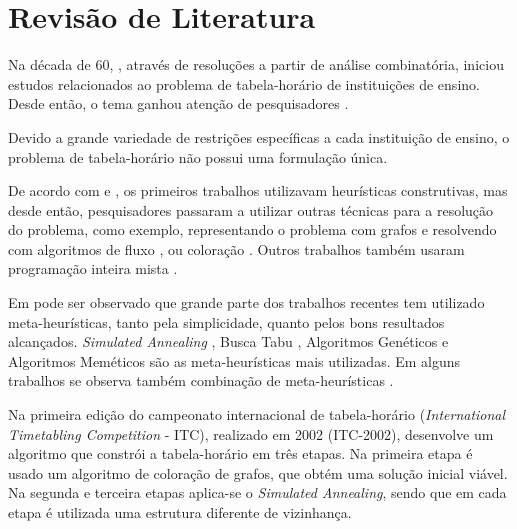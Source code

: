 \chapter{Revisão de Literatura}
\label{sec-revisao}
Na década de 60, , através de resoluções a partir de análise combinatória, iniciou estudos relacionados ao problema de tabela-horário de instituições de ensino. Desde então, o tema ganhou atenção de pesquisadores \cite{schaerf1999survey, lewis2008survey}.

Devido a grande variedade de restrições específicas a cada instituição de ensino, o problema de tabela-horário não possui uma formulação única.

De acordo com  e , os primeiros trabalhos utilizavam heurísticas construtivas, mas desde então, pesquisadores passaram a utilizar outras técnicas para a resolução do problema, como exemplo, representando o problema com grafos e resolvendo com algoritmos de fluxo \cite{ostermann1982some}, ou coloração \cite{wood1969technique, neufeld1975generalized, cangolovic1991exact}. Outros trabalhos também usaram programação inteira mista \cite{tripathy1984school, ferland1985timetabling}.

Em  pode ser observado que grande parte dos trabalhos recentes tem utilizado meta-heurísticas, tanto pela simplicidade, quanto pelos bons resultados alcançados. \textit{Simulated Annealing} \cite{mariano2014alns}, Busca Tabu \cite{machado2009proposta}, Algoritmos  Genéticos \cite{burke1994genetic} e Algoritmos Meméticos \cite{burke1995memetic} são as meta-heurísticas mais utilizadas. Em alguns trabalhos se observa também  combinação de meta-heurísticas \cite{vital2015grasp}.

Na primeira edição do campeonato internacional de tabela-horário (\textit{International Timetabling Competition} - ITC), realizado em 2002 (ITC-2002),  desenvolve um algoritmo que constrói a tabela-horário em três etapas. Na primeira etapa é usado um algoritmo de coloração de grafos, que obtém uma solução inicial viável. Na segunda e terceira etapas aplica-se o \textit{Simulated Annealing}, sendo que em cada etapa é utilizada uma estrutura diferente de vizinhança.

